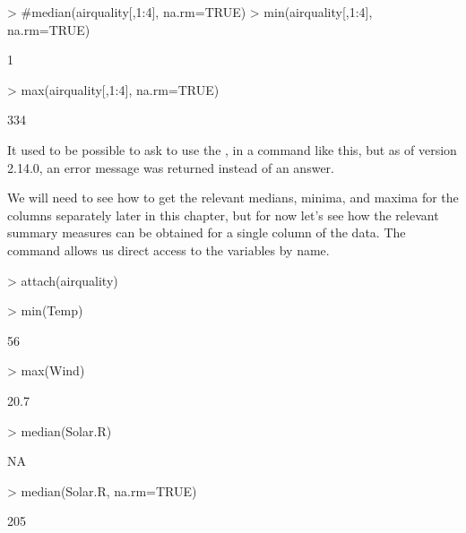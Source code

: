 \begin{Schunk}
\begin{Sinput}
> #median(airquality[,1:4], na.rm=TRUE) 
> min(airquality[,1:4], na.rm=TRUE) 
\end{Sinput}
\begin{Soutput}
[1] 1
\end{Soutput}
\begin{Sinput}
> max(airquality[,1:4], na.rm=TRUE) 
\end{Sinput}
\begin{Soutput}
[1] 334
\end{Soutput}
\end{Schunk}

 
It used to be possible to ask \R{} to use the , in a command like this, but as of version 2.14.0, an error message was returned instead of an answer. 
 
We will need to see how to get the relevant medians, minima, and maxima for the columns separately later in this chapter, but for now let's see how the relevant summary measures can be obtained for a single column of the  data. The  command allows us direct access to the variables by name. 

\begin{Schunk}
\begin{Sinput}
> attach(airquality) 
\end{Sinput}
\end{Schunk}

\begin{Schunk}
\begin{Sinput}
> min(Temp) 
\end{Sinput}
\begin{Soutput}
[1] 56
\end{Soutput}
\begin{Sinput}
> max(Wind) 
\end{Sinput}
\begin{Soutput}
[1] 20.7
\end{Soutput}
\begin{Sinput}
> median(Solar.R) 
\end{Sinput}
\begin{Soutput}
[1] NA
\end{Soutput}
\begin{Sinput}
> median(Solar.R, na.rm=TRUE) 
\end{Sinput}
\begin{Soutput}
[1] 205
\end{Soutput}
\end{Schunk}

